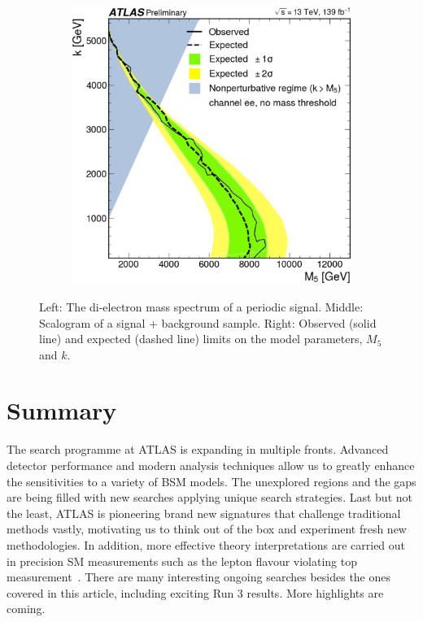 \documentclass{moriond}
\begin{document}
\begin{figure}[htp]
\begin{subfigure}[b]{0.25\textwidth}
         \label{fig:shape}
     \end{subfigure}
     \begin{subfigure}[b]{0.25\textwidth}
         \centering
         \includegraphics[width=\textwidth]{periodic}
         \label{fig:perlimits}
     \end{subfigure}
        \caption{Left: The di-electron mass spectrum of a periodic signal. Middle: Scalogram of a signal + background sample. Right: Observed (solid line) and expected (dashed line) limits on the model parameters, $M_{5}$ and $k$\protect\cite{period}.}
        \label{fig:periodic}
\end{figure}

\section{Summary}

The search programme at ATLAS is expanding in multiple fronts. Advanced detector
performance and modern analysis techniques allow us to greatly enhance the
sensitivities to a variety of BSM models. The unexplored regions and the gaps
are being filled with new searches applying unique search strategies. Last but
not the least, ATLAS is pioneering brand new signatures that challenge
traditional methods vastly, motivating us to think out of the box and experiment
fresh new methodologies. In addition, more effective theory interpretations are
carried out in precision SM measurements such as the lepton flavour violating
top measurement~\cite{top}. There are many interesting ongoing searches besides
the ones covered in this article, including exciting Run 3 results. More
highlights are coming.       
\end{document}
